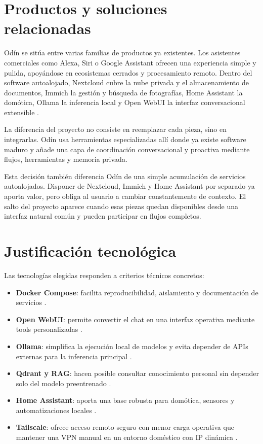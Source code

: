 \section{Productos y soluciones relacionadas}
Odín se sitúa entre varias familias de productos ya existentes. Los asistentes comerciales como Alexa, Siri o Google Assistant ofrecen una experiencia simple y pulida, apoyándose en ecosistemas cerrados y procesamiento remoto. Dentro del software autoalojado, Nextcloud cubre la nube privada y el almacenamiento de documentos, Immich la gestión y búsqueda de fotografías, Home Assistant la domótica, Ollama la inferencia local y Open WebUI la interfaz conversacional extensible \citep{nextcloudDocs,immichDocs,homeAssistantDocs,ollamaDocs,openwebuiDocs}.

La diferencia del proyecto no consiste en reemplazar cada pieza, sino en integrarlas. Odín usa herramientas especializadas allí donde ya existe software maduro y añade una capa de coordinación conversacional y proactiva mediante flujos, herramientas y memoria privada.

Esta decisión también diferencia Odín de una simple acumulación de servicios autoalojados. Disponer de Nextcloud, Immich y Home Assistant por separado ya aporta valor, pero obliga al usuario a cambiar constantemente de contexto. El salto del proyecto aparece cuando esas piezas quedan disponibles desde una interfaz natural común y pueden participar en flujos completos.

\section{Justificación tecnológica}
Las tecnologías elegidas responden a criterios técnicos concretos:
\begin{itemize}
  \item \textbf{Docker Compose}: facilita reproducibilidad, aislamiento y documentación de servicios \citep{dockerComposeDocs}.
  \item \textbf{Open WebUI}: permite convertir el chat en una interfaz operativa mediante tools personalizadas \citep{openwebuiDocs}.
  \item \textbf{Ollama}: simplifica la ejecución local de modelos y evita depender de APIs externas para la inferencia principal \citep{ollamaDocs}.
  \item \textbf{Qdrant y RAG}: hacen posible consultar conocimiento personal sin depender solo del modelo preentrenado \citep{lewis2020rag,qdrantDocs}.
  \item \textbf{Home Assistant}: aporta una base robusta para domótica, sensores y automatizaciones locales \citep{homeAssistantDocs}.
  \item \textbf{Tailscale}: ofrece acceso remoto seguro con menor carga operativa que mantener una VPN manual en un entorno doméstico con IP dinámica \citep{tailscaleConnectivity,tailscaleDynamicIp}.
\end{itemize}

